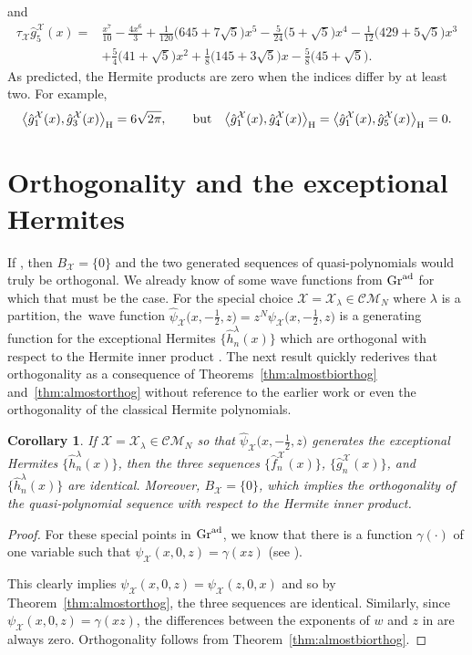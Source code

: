 \documentclass[pdftex]{sigma}
\numberwithin{equation}{section}
\newtheorem{Corollary}[Theorem]{Corollary}
\theoremstyle{definition}
\def\X{\mathcal{X}}
\def\CM{\mathcal{C\!M}}
\def\ff{\hat f}
\def\gg{\hat g}
\begin{document}
and
\begin{align*}
\tau_{\X} \gg_5^{\X}(x)={}&
\frac{x^7}{10}-\frac{4
 x^6}{3}+\frac{1}{120}
 \bigl(645+7 \sqrt{5}\bigr)
 x^5-\frac{5}{24}
 \bigl(5+\sqrt{5}\bigr)
 x^4-\frac{1}{12} \bigl(429+5
 \sqrt{5}\bigr) x^3
 \\
 &+\frac{5}{4}
 \bigl(41+\sqrt{5}\bigr)
 x^2+\frac{1}{8} \bigl(145+3
 \sqrt{5}\bigr) x-\frac{5}{8}
 \bigl(45+\sqrt{5}\bigr).
\end{align*}
As predicted, the Hermite products are zero when the indices differ by
at least two. For example,
 \[
 \big\langle \gg_1^{\X}(x),\gg_3^{\X}(x)\big\rangle_{\rm H}
 =6\sqrt{2\pi},
\qquad\text{but}\quad
 \big\langle \gg_1^{\X}(x),\gg_4^{\X}(x) \big\rangle_{\rm H}
= \big\langle \gg_1^{\X}(x),\gg_5^{\X}(x)\big\rangle_{\rm H}
=0.
 \]


\section{Orthogonality and the exceptional Hermites}

If \smash{$\hat{\hat\psi}_{\X}(x,0,z)=\hat{\hat\psi}_{\X}(xz,0,1)$}, then
$B_{\X}=\{0\}$ and the two generated sequences of quasi-poly\-nomials would truly be orthogonal.
We already know of some wave functions from ${\rm Gr}^{\rm ad}$ for which that
must be the case.
For the special choice
$\X=\X_{\lambda}\in\CM_N$ where $\lambda$ is a partition, the~wave
function $\hat\psi_{\X}\bigl(x,-\tfrac{1}{2},z\bigr)=z^N\psi_{\X}\bigl(x,-\tfrac{1}{2},z\bigr)$ is a generating function for the
exceptional Hermites $\big\{\hat h_n^\lambda(x)\big\}$ which are orthogonal
with respect to the Hermite inner product
\cite{KasMil,PThesis,PalusoKasman}. The next result quickly
rederives that
orthogonality as a consequence of Theorems~\ref{thm:almostbiorthog}
and~\ref{thm:almostorthog} without reference to the earlier
work or even the orthogonality of the classical Hermite polynomials.

\begin{Corollary}\label{cor:proddep}
If $\X=\X_{\lambda}\in\CM_N$ so that $\hat\psi_{\X}\bigl(x,-\tfrac{1}{2},z\bigr)$ generates the
exceptional Hermites $\big\{\hat h_n^{\lambda}(x)\big\}$, then
the three sequences $\big\{\ff_n^{\X}(x)\big\}$, $\big\{\gg_n^{\X}(x)\big\}$, and $\big\{\hat
h_n^{\lambda}(x)\big\}$ are identical.
Moreover, $B_{\X}=\{0\}$, which implies the orthogonality of the
quasi-polynomial sequence with respect to the Hermite inner product.
\end{Corollary}
\begin{proof}
 For these special points in ${\rm Gr}^{\rm ad}$, we know that there is a
 function $\gamma(\cdot)$ of one variable such that
$
 \psi_{\X}(x,0,z)=\gamma(xz)
$
 (see \cite[Section~10, Example~2]{WilsonBisp}).

This clearly implies
 $\psi_{\X}(x,0,z)=\psi_{\X}(z,0,x)$ and so by
 Theorem~\ref{thm:almostorthog}, the three sequences are identical.
 Similarly, since $\psi_{\X}(x,0,z)=\gamma(xz)$,
 the differences between
 the exponents of $w$ and $z$ in \smash{$\hat{\hat\psi}_{\X}(w,0,z)$} are
 always zero. Orthogonality follows from Theorem~\ref{thm:almostbiorthog}.
\end{proof}
\end{document}
